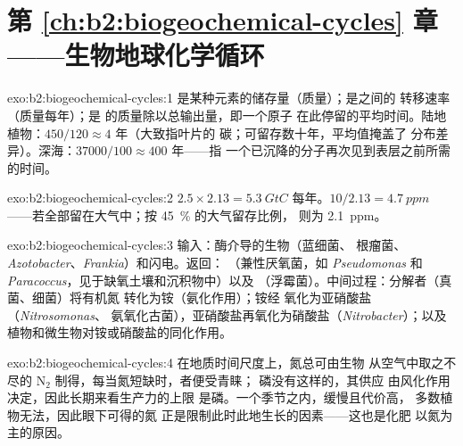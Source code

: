 \section*{第 \ref{ch:b2:biogeochemical-cycles} 章——生物地球化学循环}

\begin{solution}{exo:b2:biogeochemical-cycles:1}
是某种元素的储存量（质量）；是之间的
转移速率（质量每年）；是
的质量除以总输出量，即一个原子
在此停留的平均时间。陆地植物：$450/120 \approx 4$ 年（大致指叶片的
碳；可留存数十年，平均值掩盖了
分布差异）。深海：$37000/100 \approx 400$ 年——指
一个已沉降的分子再次见到表层之前所需的时间。
\end{solution}

\begin{solution}{exo:b2:biogeochemical-cycles:2}
$2.5\times 2.13 = \qty{5.3}{GtC}$ 每年。$10/2.13 = \qty{4.7}{ppm}$
——若全部留在大气中；按 \qty{45}{\%} 的大气留存比例，
则为 \qty{2.1}{ppm}。
\end{solution}

\begin{solution}{exo:b2:biogeochemical-cycles:3}
输入：酶介导的生物（蓝细菌、
根瘤菌、\emph{Azotobacter}、\emph{Frankia}）和闪电。返回：
（兼性厌氧菌，如 \emph{Pseudomonas}
和 \emph{Paracoccus}，见于缺氧土壤和沉积物中）以及
（浮霉菌）。中间过程：分解者（真菌、细菌）将有机氮
转化为铵（氨化作用）；铵经
氧化为亚硝酸盐（\emph{Nitrosomonas}、
氨氧化古菌），亚硝酸盐再氧化为硝酸盐（\emph{Nitrobacter}）；以及
植物和微生物对铵或硝酸盐的同化作用。
\end{solution}

\begin{solution}{exo:b2:biogeochemical-cycles:4}
在地质时间尺度上，氮总可由生物
从空气中取之不尽的 $\mathrm{N_2}$ 制得，每当氮短缺时，者便受青睐；
磷没有这样的，其供应
由风化作用决定，因此长期来看生产力的上限
是磷。一个季节之内，缓慢且代价高，
多数植物无法，因此眼下可得的氮
正是限制此时此地生长的因素——这也是化肥
以氮为主的原因。
\end{solution}

